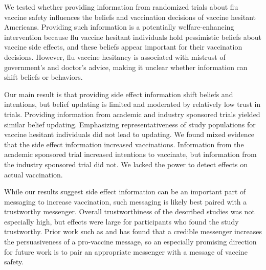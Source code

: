 
We tested whether providing information from randomized trials about
flu vaccine safety influences the beliefs and vaccination decisions of
vaccine hesitant Americans. 
Providing such information is a potentially  welfare-enhancing intervention because 
flu vaccine hesitant individuals hold
pessimistic beliefs about vaccine side effects, and these beliefs appear 
important for their vaccination decisions.  However, flu vaccine hesitancy
is associated with mistrust of government's and doctor's advice, making 
it unclear whether information can shift beliefs or behaviors.

Our main result is that providing side effect information shift
beliefs and intentions, but belief updating is limited and moderated by
relatively low trust in trials. Providing information from academic and industry 
sponsored trials yielded similar belief updating. Emphasizing representativeness
of study populations for vaccine hesitant individuals did not lead to updating. 
We found mixed evidence that the side effect information increased vaccinations. 
Information from the academic sponsored trial increased intentions to vaccinate,
but information from the industry sponsored trial did not. We lacked the power
to detect effects on actual vaccination. 

While our results suggest side effect information can be an important part of messaging 
to increase vaccination, such messaging is likely best paired with a trustworthy messenger.
Overall trustworthiness of the described studies was not especially high, but effects
were large for participants who found the study trustworthy. 
Prior work such as \citet{larsen2023counter} and \citet{alsan2024experimental} has found
that  a credible messenger increases the persuasiveness of a pro-vaccine message, so
an especially promising direction for future work is to pair an appropriate messenger
with a message of vaccine safety. 
